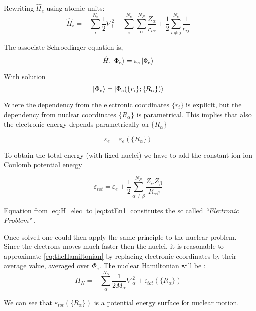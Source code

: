 \documentclass[a4paper,12pt]{article}
\begin{document}
Rewriting $\hat{H}_{e}$  using atomic units:
\begin{equation}\label{eq:H_elec}
	\hat{H}_{e} = 	- \sum_{i}^{N_{e}} \frac{1}{2} \nabla_{i}^2  
					- \sum_{i}^{N_{e}} \sum_{\alpha}^{N_{N}} \frac{Z_{\alpha}}{r_{i\alpha}}  
					+ \frac{1}{2} \sum_{i \neq j}^{N_{e}} \frac{1}{r_{ij}}
\end{equation}

The associate Schroedinger equation is,
\begin{equation}
	\hat{H}_{e} \ket{\Phi_{e}} = \varepsilon_{e} \ket{\Phi_{e}}
\end{equation}

With solution
\begin{equation}
	\ket{\Phi_{e}} = \ket{\Phi_{e}( \{r_{i}\};\{R_{\alpha}\} )}
\end{equation}

Where the dependency from the electronic coordinates $\{r_i\}$ is explicit, but the dependency from nuclear coordinates $\{R_{\alpha}\}$ is parametrical.
This implies that also the electronic energy depends parametrically on $\{R_{\alpha}\}$

\begin{equation}
	\varepsilon_{e} = \varepsilon_{e}(\{R_{\alpha}\})
\end{equation}

To obtain the total energy (with fixed nuclei) we have to add the constant ion-ion Coulomb potential energy

\begin{equation}\label{eq:totEn1}
	\varepsilon_{tot} = \varepsilon_{e} + \frac{1}{2} \sum_{\alpha \neq \beta}^{N_N} \frac{Z_{\alpha} Z_{\beta} }{R_{\alpha \beta}}
\end{equation}

Equation from \eqref{eq:H_elec} to \eqref{eq:totEn1} constitutes the so called \textit{``Electronic Problem"} \cite[p.44]{Attila}.

Once solved one could then apply the same principle to the nuclear problem.
Since the electrons moves much faster then the nuclei, it is reasonable to approximate \eqref{eq:theHamiltonian} by replacing electronic coordinates by their average value, averaged over $\Phi_{e}$.
The nuclear Hamiltonian will be :
\begin{equation}
	H_{N} = - \sum_{\alpha}^{N_{\alpha}} \frac{1}{2M_{\alpha}} \nabla_{\alpha}^2 + \varepsilon_{tot}(\{ R_{\alpha}\})
\end{equation}

We can see that $\varepsilon_{tot}(\{ R_{\alpha}\})$ is a potential energy surface for nuclear motion.
\end{document}
